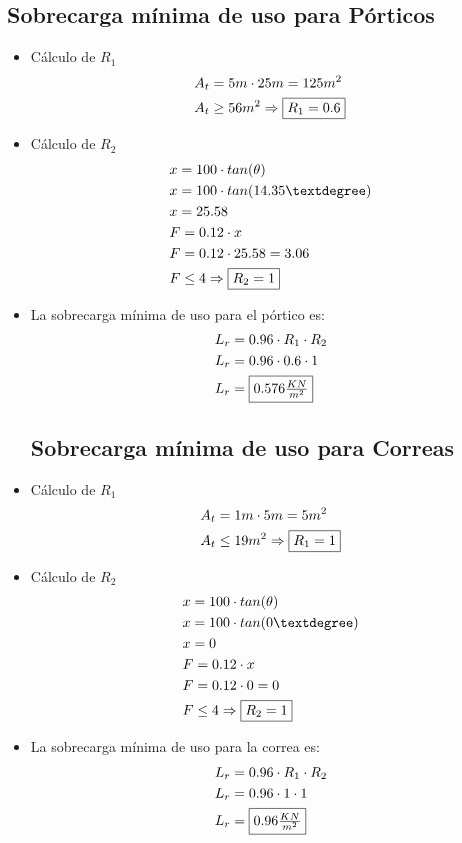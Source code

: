 \subsection{Sobrecarga mínima de uso para Pórticos}
\begin{itemize}
\item Cálculo de $R_1$
\begin{align*}
& A_t = 5m \cdot 25m = 125 m^2\\
& A_t \geq 56 m^2 \Rightarrow \framebox{$R_1 = 0.6$}
\end{align*}
\item Cálculo de $R_2$
\begin{align*}
& x = 100 \cdot tan(\theta) \\
& x = 100 \cdot tan(14.35°) \\
& x = 25.58 \\
& F = 0.12 \cdot x \\
& F = 0.12 \cdot 25.58 = 3.06 \\
& F \leq 4 \Rightarrow \framebox{$R_2 = 1$}
\end{align*}
\item La sobrecarga mínima de uso para el pórtico es:
\begin{align*}
& L_r = 0.96 \cdot R_1 \cdot R_2 \\
& L_r = 0.96 \cdot 0.6 \cdot 1 \\
& L_r = \framebox{$0.576\frac{KN}{m^2}$}
\end{align*}
\subsection{Sobrecarga mínima de uso para Correas}
\item Cálculo de $R_1$
\begin{align*}
& A_t = 1m \cdot 5m = 5 m^2\\
& A_t \leq 19 m^2 \Rightarrow \framebox{$R_1 = 1$}
\end{align*}
\item Cálculo de $R_2$
\begin{align*}
& x = 100 \cdot tan(\theta) \\
& x = 100 \cdot tan(0°) \\
& x = 0 \\
& F = 0.12 \cdot x \\
& F = 0.12 \cdot 0 = 0 \\
& F \leq 4 \Rightarrow \framebox{$R_2 = 1$}
\end{align*}
\item La sobrecarga mínima de uso para la correa es:
\begin{align*}
& L_r = 0.96 \cdot R_1 \cdot R_2 \\
& L_r = 0.96 \cdot 1 \cdot 1 \\
& L_r = \framebox{$0.96\frac{KN}{m^2}$}
\end{align*}
\end{itemize}

